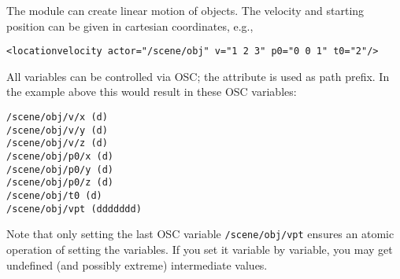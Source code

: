 The  module can create linear motion of
objects. The velocity  and starting position  can be
given in cartesian coordinates, e.g.,
\begin{lstlisting}[numbers=none]
<locationvelocity actor="/scene/obj" v="1 2 3" p0="0 0 1" t0="2"/>
\end{lstlisting}



All variables can be controlled via OSC; the  attribute is
used as path prefix. In the example above this would result in these
OSC variables:
\begin{verbatim}
/scene/obj/v/x (d)
/scene/obj/v/y (d)
/scene/obj/v/z (d)
/scene/obj/p0/x (d)
/scene/obj/p0/y (d)
/scene/obj/p0/z (d)
/scene/obj/t0 (d)
/scene/obj/vpt (ddddddd)
\end{verbatim}
Note that only setting the last OSC variable \verb!/scene/obj/vpt! ensures an atomic operation of setting the variables. If you set it variable by variable, you may get undefined (and possibly extreme) intermediate values.


